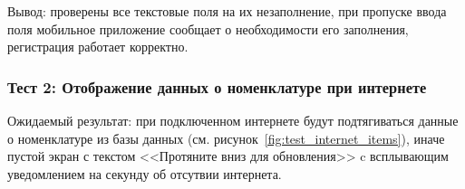     

Вывод: проверены все текстовые поля на их незаполнение, при пропуске ввода поля мобильное приложение сообщает о необходимости его заполнения, регистрация работает корректно.


\subsubsection*{Тест 2: Отображение данных о номенклатуре при интернете}

Ожидаемый результат: при подключенном интернете будут подтягиваться данные о номенклатуре из базы данных (см. рисунок~\ref{fig:test_internet_items}),
иначе пустой экран с текстом <<Протяните вниз для обновления>>
c всплывающим уведомлением на секунду об отсутвии интернета.







